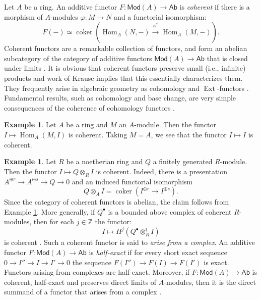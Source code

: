 \documentclass[a4paper]{amsart}
\theoremstyle{plain}
\theoremstyle{definition}
\newtheorem{example}[theorem]{Example}
\theoremstyle{remark}
\numberwithin{equation}{section}
\newcommand\ZZ{\mathbb{Z}}
\newcommand\Mod{\mathsf{Mod}}
\newcommand\Ab{\mathsf{Ab}}
\DeclareMathOperator{\Hom}{Hom}
\newcommand{\DERF}[1]{\mathsf{{#1}}}
\newcommand{\LDERF}{\DERF{L}}
\DeclareMathOperator{\Ext}{Ext}
\DeclareMathOperator{\coker}{coker}
\begin{document}
Let $A$ be a ring. An additive functor $F \colon \Mod(A) \to \Ab$ is \emph{coherent} if there is a morphism of $A$-modules $\varphi\colon M \to N$ and a functorial isomorphism:
\[
  F(-) \simeq \coker(\Hom_{A}(N,-) \xrightarrow{\varphi^*} \Hom_{A}(M,-)). 
\]
Coherent functors are a remarkable collection of functors, and form an
abelian subcategory of the category of additive functors
$\Mod(A) \to \Ab$ that is closed under limits \cite{auslander}. It is obvious that coherent functors preserve small (i.e., infinite) products and work
of Krause \cite[Prop.~3.2]{MR2026723} implies that this essentially characterizes them. They frequently arise in algebraic geometry as cohomology and
$\Ext$-functors \cite{hartshorne-coherent}. Fundamental results, such
as cohomology and base change, are very simple consequences of the
coherence of cohomology functors \cite{hallj_coho_bc}.
\begin{example}\label{E:coherent-functor1}
  Let $A$ be a ring and $M$ an $A$-module. Then the functor
  $I \mapsto \Hom_A(M,I)$ is coherent. Taking $M=A$, we see that the
  functor $I \mapsto I$ is coherent.
\end{example}
\begin{example}\label{E:coherent-functor2}
  Let $R$ be a noetherian ring and $Q$ a finitely generated
  $R$-module. Then the functor
  $I \mapsto {Q}\otimes_{R} I$ is
  coherent. Indeed, there is a presentation
  $A^{\oplus r} \to A^{\oplus s} \to {Q} \to 0$ and an
  induced functorial isomorphism
  \[
    {Q}\otimes_{A} I = \coker(I^{\oplus r} \to I^{\oplus s}).
  \]
  Since the category of coherent functors is abelian, the claim
  follows from Example \ref{E:coherent-functor1}. More generally, if
  $Q^\bullet$ is a bounded above complex of coherent
  $R$-modules, then for each $j\in \ZZ$ the functor:
  \[
    I \mapsto H^j({Q}^\bullet\otimes^{\LDERF}_{R} I)
  \]
  is coherent \cite[Ex.~2.3]{hartshorne-coherent}. Such a coherent
  functor is said to \emph{arise from a complex}. An additive functor
  $F \colon \Mod(A) \to \Ab$ is \emph{half-exact} if for every short
  exact sequence $0 \to I'' \to I \to I' \to 0$ the sequence
  $F(I'') \to F(I) \to F(I')$ is exact. Functors arising from
  complexes are half-exact. Moreover, if $F \colon \Mod(A) \to \Ab$ is
  coherent, half-exact and preserves direct limits of $A$-modules,
  then it is the direct summand of a functor that arises from a complex
  \cite[Prop.~4.6]{hartshorne-coherent}.
\end{example}
\end{document}
